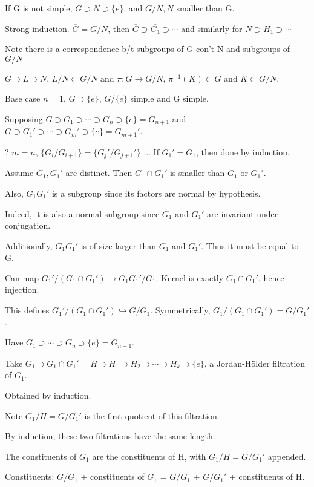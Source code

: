 \documentclass[12pt]{article}
\begin{document}
If G is not simple, $G \supset N \supset \{e\}$, and $G/N, N$ smaller than G.

Strong induction.  $\overline{G} = G/N$, then $\overline{G} \supset \overline{G_1} \supset \cdots$ and similarly for $N \supset H_1 \supset \cdots$

Note there is a correspondence b/t subgroups of G con't N and subgroups of $G/N$

$G \supset L \supset N$, $L/N \subset G/N$ and $\pi: G \to G/N$, $\pi^{-1}(K) \subset G$ and $K \subset G/N$.

\noindent
Base case $n = 1$, $G \supset \{e\}$, $G/\{e\}$ simple and G simple.

\noindent
Supposing $G \supset G_1 \supset \cdots \supset G_n \supset \{e\} = G_{n + 1}$ and $G \supset G_1' \supset \cdots \supset G_m' \supset \{e\} = G_{m + 1}'$.

? $m = n$, $\{G_i / G_{i + 1}\} = \{G_j'/G_{j + 1}'\}$ ... If $G_1' = G_1$, then done by induction.

Assume $G_1, G_1'$ are distinct.  Then $G_1 \cap G_1'$ is smaller than $G_1$ or $G_1'$.

Also, $G_1G_1'$ is a subgroup since its factors are normal by hypothesis.

Indeed, it is also a normal subgroup since $G_1$ and $G_1'$ are invariant under conjugation.

Additionally, $G_1G_1'$ is of size larger than $G_1$ and $G_1'$.  Thus it must be equal to G.

Can map $G_1'/(G_1 \cap G_1') \to G_1G_1'/G_1$.  Kernel is exactly $G_1 \cap G_1'$, hence injection.

This defines $G_1'/(G_1 \cap G_1') \hookrightarrow G/G_1$.  Symmetrically, $G_1/(G_1 \cap G_1') = G/G_1'$.

Have $G_1 \supset \cdots \supset G_n \supset \{e\} = G_{n + 1}$.

Take $G_1 \supset G_1 \cap G_1' = H \supset H_1 \supset H_2 \supset \cdots \supset H_k \supset \{e\}$, a Jordan-H\"{o}lder filtration of $G_1$.

Obtained by induction.

Note $G_1/H = G/G_1'$ is the first quotient of this filtration.

By induction, these two filtrations have the same length.

The constituents of $G_1$ are the constituents of H, with $G_1/H = G/G_1'$ appended.

Constituents: $G/G_1$ + constituents of $G_1$ = $G/G_1$ + $G/G_1'$ + constituents of H.
\end{document}
